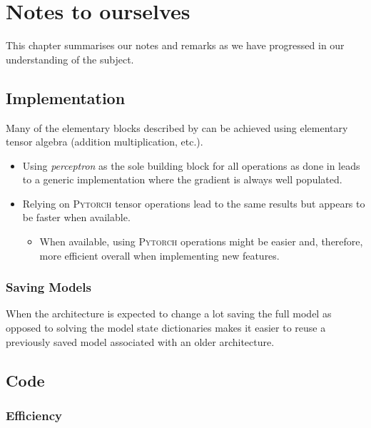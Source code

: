 \chapter[Notes to ourselves]{Notes to ourselves}
\label{chap:Note}
\begin{chapabstract}
    This chapter summarises our notes and remarks as we have progressed in our understanding of the subject.
\end{chapabstract}

\minitoc

\section{Implementation}
    Many of the elementary blocks described by \cite{zhang_hierarchical_2021} can be achieved using elementary tensor algebra (addition multiplication, etc.).
    \begin{itemize}
        \item Using \emph{perceptron} as the sole building block for all operations as done in \parencite{zhang_hierarchical_2021} leads to a generic implementation where the gradient is always well populated.
        \item Relying on \textsc{Pytorch} tensor operations lead to the same results but appears to be faster when available.
        \begin{itemize}
            \item When available, using \textsc{Pytorch} operations might be easier and, therefore, more efficient overall when implementing new features.
        \end{itemize}
    \end{itemize}

    \subsection{Saving Models}

    When the architecture is expected to change a lot saving the full model as opposed to solving the model state dictionaries makes it easier to reuse a previously saved model associated with an older architecture. 

    \section{Code}
    \subsection{Efficiency}
